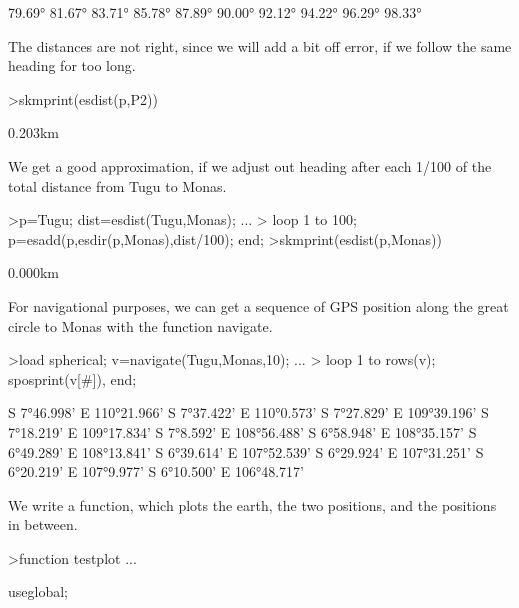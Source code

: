 \documentclass{article}
\begin{document}
\begin{eulernotebook}
\begin{eulercomment}
\begin{eulercomment}
\begin{eulercomment}
\begin{eulercomment}
\begin{eulercomment}
\begin{eulercomment}
\begin{eulercomment}
\begin{eulercomment}
\begin{euleroutput}
       79.69°
       81.67°
       83.71°
       85.78°
       87.89°
       90.00°
       92.12°
       94.22°
       96.29°
       98.33°
\end{euleroutput}
\begin{eulercomment}
The distances are not right, since we will add a bit off error, if we
follow the same heading for too long.
\end{eulercomment}
\begin{eulerprompt}
>skmprint(esdist(p,P2))
\end{eulerprompt}
\begin{euleroutput}
       0.203km
\end{euleroutput}
\begin{eulercomment}
We get a good approximation, if we adjust out heading after each 1/100 of the total distance
from Tugu to Monas.
\end{eulercomment}
\begin{eulerprompt}
>p=Tugu; dist=esdist(Tugu,Monas); ...
>  loop 1 to 100; p=esadd(p,esdir(p,Monas),dist/100); end;
>skmprint(esdist(p,Monas))
\end{eulerprompt}
\begin{euleroutput}
       0.000km
\end{euleroutput}
\begin{eulercomment}
For navigational purposes, we can get a sequence of GPS position along the great circle to
Monas with the function navigate.
\end{eulercomment}
\begin{eulerprompt}
>load spherical; v=navigate(Tugu,Monas,10); ...
>  loop 1 to rows(v); sposprint(v[#]), end;
\end{eulerprompt}
\begin{euleroutput}
  S 7°46.998' E 110°21.966'
  S 7°37.422' E 110°0.573'
  S 7°27.829' E 109°39.196'
  S 7°18.219' E 109°17.834'
  S 7°8.592' E 108°56.488'
  S 6°58.948' E 108°35.157'
  S 6°49.289' E 108°13.841'
  S 6°39.614' E 107°52.539'
  S 6°29.924' E 107°31.251'
  S 6°20.219' E 107°9.977'
  S 6°10.500' E 106°48.717'
\end{euleroutput}
\begin{eulercomment}
We write a function, which plots the earth, the two positions, and the
positions in between.
\end{eulercomment}
\begin{eulerprompt}
>function testplot ...
\end{eulerprompt}
\begin{eulerudf}
  useglobal;

\end{eulerudf}
\end{eulercomment}
\end{eulercomment}
\end{eulercomment}
\end{eulercomment}
\end{eulercomment}
\end{eulercomment}
\end{eulercomment}
\end{eulercomment}
\end{eulernotebook}
\end{document}
